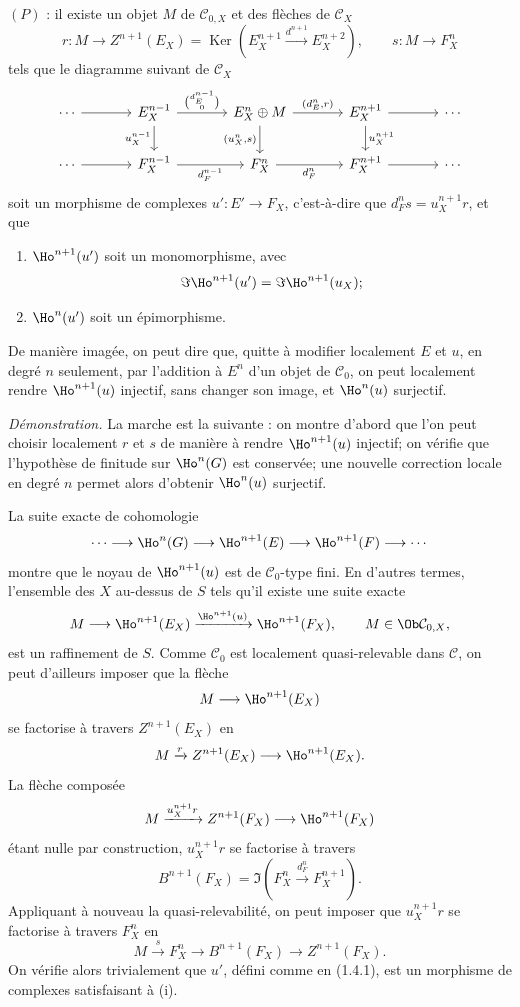 \documentclass[11pt]{article}
\providecommand{\Ker}{\operatorname{Ker}}
\begin{document}
\((P)\) : il existe un objet \(M\) de \(\mathcal C_{0,X}\) et des flèches de \(\mathcal C_X\)
\[
  r:M\longrightarrow Z^{n+1}(E_X)=
  \Ker\!\left(E_X^{n+1}\xrightarrow{d^{n+1}}E_X^{n+2}\right),
  \qquad
  s:M\longrightarrow F_X^n
\]
tels que le diagramme suivant de \(\mathcal C_X\)
\[
\begin{tikzcd}[column sep=large]
\cdots \arrow[r] & E_X^{n-1}
 \arrow[r,"{\binom{d_E^{n-1}}{0}}"]
 \arrow[d,"u_X^{n-1}"'] &
E_X^n\oplus M
 \arrow[r,"{(d_E^n,r)}"]
 \arrow[d,"{(u_X^n,s)}"'] &
E_X^{n+1} \arrow[r] \arrow[d,"u_X^{n+1}"] &
\cdots\\
\cdots \arrow[r] & F_X^{n-1} \arrow[r,"d_F^{n-1}"'] &
F_X^n \arrow[r,"d_F^n"'] &
F_X^{n+1} \arrow[r] &
\cdots
\end{tikzcd}
\]
soit un morphisme de complexes \(u':E'\to F_X\), c'est-à-dire que \(d_F^n s=u_X^{n+1}r\), et que
\begin{enumerate}[label=(\roman*)]
\item \(\Ho^{n+1}(u')\) soit un monomorphisme, avec
\[
  \Im\Ho^{n+1}(u')=\Im\Ho^{n+1}(u_X);
\]
\item \(\Ho^n(u')\) soit un épimorphisme.
\end{enumerate}

De manière imagée, on peut dire que, quitte à modifier localement \(E\) et \(u\), en degré \(n\) seulement, par l'addition à \(E^n\) d'un objet de \(\mathcal C_0\), on peut localement rendre \(\Ho^{n+1}(u)\) injectif, sans changer son image, et \(\Ho^n(u)\) surjectif.

\emph{Démonstration.} La marche est la suivante : on montre d'abord que l'on peut choisir localement \(r\) et \(s\) de manière à rendre \(\Ho^{n+1}(u)\) injectif; on vérifie que l'hypothèse de finitude sur \(\Ho^n(G)\) est conservée; une nouvelle correction locale en degré \(n\) permet alors d'obtenir \(\Ho^n(u)\) surjectif.

La suite exacte de cohomologie
\[
  \cdots\longrightarrow \Ho^n(G)\longrightarrow
  \Ho^{n+1}(E)\longrightarrow
  \Ho^{n+1}(F)\longrightarrow \cdots
\]
montre que le noyau de \(\Ho^{n+1}(u)\) est de \(\mathcal C_0\)-type fini. En d'autres termes, l'ensemble des \(X\) au-dessus de \(S\) tels qu'il existe une suite exacte
\[
  M\longrightarrow \Ho^{n+1}(E_X)
  \xrightarrow{\Ho^{n+1}(u)}
  \Ho^{n+1}(F_X),
  \qquad M\in\Ob\mathcal C_{0,X},
\]
est un raffinement de \(S\). Comme \(\mathcal C_0\) est localement quasi-relevable dans \(\mathcal C\), on peut d'ailleurs imposer que la flèche
\[
  M\longrightarrow \Ho^{n+1}(E_X)
\]
se factorise à travers \(Z^{n+1}(E_X)\) en
\[
  M\xrightarrow{r}Z^{n+1}(E_X)\longrightarrow \Ho^{n+1}(E_X).
\]
La flèche composée
\[
  M\xrightarrow{u_X^{n+1}r}Z^{n+1}(F_X)\longrightarrow \Ho^{n+1}(F_X)
\]
étant nulle par construction, \(u_X^{n+1}r\) se factorise à travers
\[
  B^{n+1}(F_X)=\Im\!\left(F_X^n\xrightarrow{d_F^n}F_X^{n+1}\right).
\]
Appliquant à nouveau la quasi-relevabilité, on peut imposer que \(u_X^{n+1}r\) se factorise à travers \(F_X^n\) en
\[
  M\xrightarrow{s}F_X^n\longrightarrow B^{n+1}(F_X)\longrightarrow Z^{n+1}(F_X).
\]
On vérifie alors trivialement que \(u'\), défini comme en (1.4.1), est un morphisme de complexes satisfaisant à (i).
\end{document}
